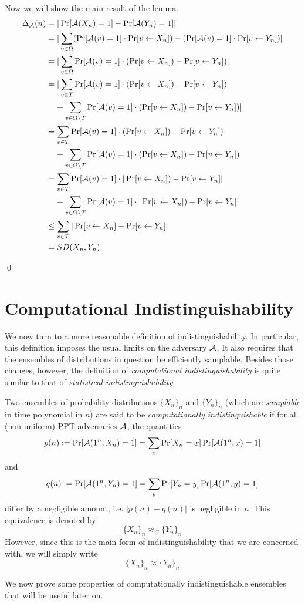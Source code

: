 Now we will show the main result of the lemma.
\begin{align*}
    \Delta_{\mathcal{A}}(n) &= |\Pr[\mathcal{A}(X_n) = 1] - \Pr[\mathcal{A}(Y_n) = 1]| \\
    &= |\sum\limits_{v \in \Omega} (\Pr[\mathcal{A}(v) = 1] \cdot \Pr[v \leftarrow X_n]) - (\Pr[\mathcal{A}(v) = 1] \cdot \Pr[v \leftarrow Y_n])|\\
    &= |\sum\limits_{v \in \Omega} \Pr[\mathcal{A}(v) = 1] \cdot ( \Pr[v \leftarrow X_n]) - \Pr[v \leftarrow Y_n])| \\
    &= |\sum\limits_{v \in T} \Pr[\mathcal{A}(v) = 1] \cdot ( \Pr[v \leftarrow X_n]) - \Pr[v \leftarrow Y_n]) \\
    &\;\;\;\; + \sum\limits_{v \in \Omega \setminus T} \Pr[\mathcal{A}(v) = 1] \cdot ( \Pr[v \leftarrow X_n]) - \Pr[v \leftarrow Y_n])| \\
    &= \sum\limits_{v \in T} \Pr[\mathcal{A}(v) = 1] \cdot ( \Pr[v \leftarrow X_n]) - \Pr[v \leftarrow Y_n]) \\
    &\;\;\;\; + \sum\limits_{v \in \Omega \setminus T} \Pr[\mathcal{A}(v) = 1] \cdot ( \Pr[v \leftarrow X_n]) - \Pr[v \leftarrow Y_n]) \\
    &= \sum\limits_{v \in T} \Pr[\mathcal{A}(v) = 1] \cdot |\Pr[v \leftarrow X_n]) - \Pr[v \leftarrow Y_n]| \\
    &\;\;\;\; + \sum\limits_{v \in \Omega \setminus T} \Pr[\mathcal{A}(v) = 1] \cdot |\Pr[v \leftarrow X_n]) - \Pr[v \leftarrow Y_n]| \\
    &\le \sum\limits_{v \in T} |\Pr[v \leftarrow X_n] - \Pr[v \leftarrow Y_n]|\\
    &= SD(X_n, Y_n)
\end{align*}

\qed


\section{Computational Indistinguishability}
We now turn to a more reasonable definition of indistinguishability.
In particular, this definition imposes the usual limits on the adversary $\mathcal{A}$. 
It also requires that the ensembles of distributions in question be efficiently samplable.
Besides those changes, however, the definition of \emph{computational indistinguishability} is quite similar to that of \emph{statistical indistinguishability}.

\begin{definition}
Two ensembles of probability distributions $\{X_n\}_n$ and $\{Y_n\}_n$ (which are \emph{samplable} in time polynomial in $n$) are said to be \emph{computationally indistinguishable} if for all (non-uniform) PPT adversaries $\mathcal{A}$, the quantities
$$p(n) := \Pr[\mathcal{A}(1^n, X_n) = 1] = \sum_x \Pr[X_n = x]\Pr[\mathcal{A}(1^n,x) = 1]$$
and
$$q(n) := \Pr[\mathcal{A}(1^n,Y_n) = 1] = \sum_y \Pr[Y_n = y]\Pr[\mathcal{A}(1^n,y) = 1]$$
differ by a negligible amount; i.e. $|p(n) - q(n)|$ is negligible in $n$.    
This equivalence is denoted by
$$\{X_n\}_n\approx_C \{Y_n\}_n$$
However, since this is the main form of indistinguishability that we are concerned with, we will simply write
$$\{X_n\}_n\approx \{Y_n\}_n$$
\end{definition}
We now prove some properties of computationally indistinguishable ensembles that will be useful later on.

